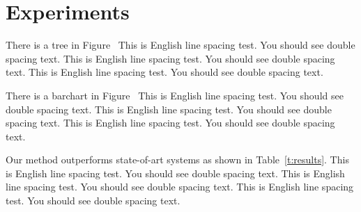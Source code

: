 \chapter{Experiments}
\label{c:experiment}

There is a tree in Figure~%
This is English line spacing test. You should see double spacing text.
This is English line spacing test. You should see double spacing text.
This is English line spacing test. You should see double spacing text.

%

There is a barchart in Figure~%
This is English line spacing test. You should see double spacing text.
This is English line spacing test. You should see double spacing text.
This is English line spacing test. You should see double spacing text.

%

Our method outperforms state-of-art systems as shown in Table~\ref{t:results}.
This is English line spacing test. You should see double spacing text.
This is English line spacing test. You should see double spacing text.
This is English line spacing test. You should see double spacing text.



